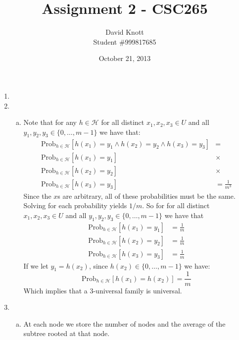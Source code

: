 \documentclass[letterpaper,10pt]{article}
\begin{document}
\title{Assignment 2 - CSC265}
\author{David Knott \\  Student \#999817685}
\date{October 21, 2013}
\maketitle
\begin{enumerate}
	\item 

	\clearpage
	\item 
	\begin{enumerate}[a)]
		\item Note that for any $h \in \mathcal{H}$ for all distinct $x_1,x_2,x_3 \in U$ and all $y_1,y_2,y_3 \in \{0,\dots,m-1\}$ we have that:
		\begin{align*}
		\text{Prob}_{h\in\mathcal{H}}[ h(x_1) = y_1 \wedge h(x_2) = y_2 \wedge h(x_3) = y_3 ] & = \\
		\text{Prob}_{h\in\mathcal{H}}[h(x_1) = y_1] & \times \\
		\text{Prob}_{h\in\mathcal{H}}[h(x_2) = y_2] & \times \\
		\text{Prob}_{h\in\mathcal{H}}[h(x_3) = y_3] & = \frac{1}{m^3}
		\end{align*}
		Since the $x$s are arbitrary, all of these probabilities must be the same. Solving for each probability yields $1/m$. So for for all distinct $x_1,x_2,x_3 \in U$ and all $y_1,y_2,y_3 \in \{0,\dots,m-1\}$ we have that 
		\begin{align*}
		\text{Prob}_{h\in\mathcal{H}}[h(x_1) = y_1] & = \frac{1}{m} \\
		\text{Prob}_{h\in\mathcal{H}}[h(x_2) = y_2] & = \frac{1}{m} \\
		\text{Prob}_{h\in\mathcal{H}}[h(x_3) = y_3] & = \frac{1}{m}
		\end{align*}
		If we let $y_1 = h(x_2)$, since $h(x_2) \in \{0,\dots,m-1 \}$ we have:
		$$ \text{Prob}_{h\in\mathcal{H}}[h(x_1) = h(x_2)] = \frac{1}{m} $$
		Which implies that a 3-universal family is universal.
	\end{enumerate}
	\clearpage

	\item
	\begin{enumerate}[a)]
		\item At each node we store the number of nodes and the average of the subtree rooted at that node.


\end{enumerate}
\end{enumerate}
\end{document}
